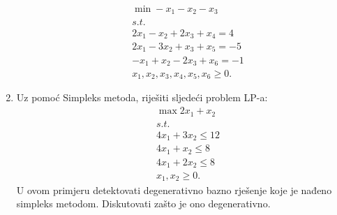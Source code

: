 \documentclass[a4paper, utf8, 11pt, colorlinks]{book}
\begin{document}
\begin{enumerate}
\begin{align*}
    & \min -x_1 - x_2 - x_3 \\
    & s.t. \\
    & 2 x_1 - x_2 + 2 x_3 + x_4 = 4 \\
    & 2x_1 - 3x_2 + x_3 + x_5 =  -5 \\
    & -x_1 + x_2 - 2x_3 + x_6 = -1 \\
    & x_1, x_2, x_3, x_4, x_5, x_6 \geq 0.	
\end{align*}
\item Uz pomoć Simpleks metoda, riješiti sljedeći problem LP-a:
\begin{align*}
	 &\max 2x_1 + x_2 \\
	 & s.t. \\
	 &4 x_1 + 3 x_2 \leq 12 \\
	 & 4 x_1 + x_2 \leq 8 \\
	 & 4 x_1 + 2 x_2 \leq 8 \\
	 & x_1, x_2 \geq 0.
\end{align*}
U ovom primjeru detektovati degenerativno bazno rješenje koje je nađeno simpleks metodom. Diskutovati zašto je ono degenerativno. 

\end{enumerate}
\end{document}
